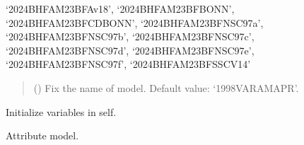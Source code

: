 \documentclass[letterpaper,10pt,english]{sphinxmanual}
\begin{document}
\begin{fulllineitems}
‘2024\sphinxhyphen{}BHF\sphinxhyphen{}AM\sphinxhyphen{}23BF\sphinxhyphen{}Av18’, ‘2024\sphinxhyphen{}BHF\sphinxhyphen{}AM\sphinxhyphen{}23BF\sphinxhyphen{}BONN’, ‘2024\sphinxhyphen{}BHF\sphinxhyphen{}AM\sphinxhyphen{}23BF\sphinxhyphen{}CDBONN’,     ‘2024\sphinxhyphen{}BHF\sphinxhyphen{}AM\sphinxhyphen{}23BF\sphinxhyphen{}NSC97a’, ‘2024\sphinxhyphen{}BHF\sphinxhyphen{}AM\sphinxhyphen{}23BF\sphinxhyphen{}NSC97b’, ‘2024\sphinxhyphen{}BHF\sphinxhyphen{}AM\sphinxhyphen{}23BF\sphinxhyphen{}NSC97c’, ‘2024\sphinxhyphen{}BHF\sphinxhyphen{}AM\sphinxhyphen{}23BF\sphinxhyphen{}NSC97d’,     ‘2024\sphinxhyphen{}BHF\sphinxhyphen{}AM\sphinxhyphen{}23BF\sphinxhyphen{}NSC97e’, ‘2024\sphinxhyphen{}BHF\sphinxhyphen{}AM\sphinxhyphen{}23BF\sphinxhyphen{}NSC97f’, ‘2024\sphinxhyphen{}BHF\sphinxhyphen{}AM\sphinxhyphen{}23BF\sphinxhyphen{}SSCV14’
\begin{quote}\begin{description}
\sphinxAtStartPar
{} (\sphinxstyleliteralemphasis{\sphinxupquote{, }}) \textendash{} Fix the name of model. Default value: ‘1998\sphinxhyphen{}VAR\sphinxhyphen{}AM\sphinxhyphen{}APR’.

\end{description}\end{quote}

\sphinxAtStartPar
{}

\begin{fulllineitems}
\label{\detokenize{source/api/setup_micro_matter:nucleardatapy.setup_micro_matter.SetupMicroMatter.init_self}}
\pysigstartsignatures
{}
\pysigstopsignatures
\sphinxAtStartPar
Initialize variables in self.

\end{fulllineitems}


\begin{fulllineitems}
\label{\detokenize{source/api/setup_micro_matter:nucleardatapy.setup_micro_matter.SetupMicroMatter.model}}
\pysigstartsignatures
{}
\pysigstopsignatures
\sphinxAtStartPar
Attribute model.


\end{fulllineitems}
\end{fulllineitems}
\end{document}
